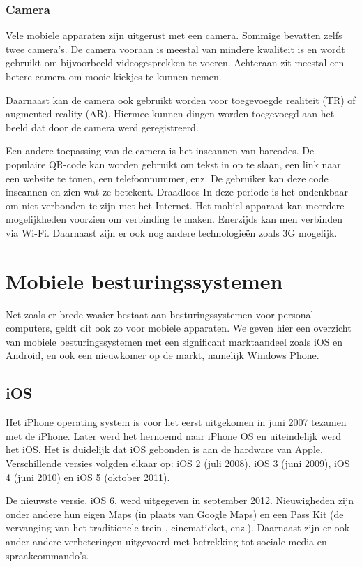\subsubsection{Camera}
Vele mobiele apparaten zijn uitgerust met een camera. Sommige bevatten zelfs twee camera's. De camera vooraan is meestal van mindere kwaliteit is en wordt gebruikt om bijvoorbeeld videogesprekken te voeren. Achteraan zit meestal een betere camera om mooie kiekjes te kunnen nemen.

Daarnaast kan de camera ook gebruikt worden voor toegevoegde realiteit (TR) of  augmented reality (AR). Hiermee kunnen dingen worden toegevoegd aan het beeld dat door de camera werd geregistreerd.

Een andere toepassing van de camera is het inscannen van barcodes. De populaire QR-code kan worden gebruikt om tekst in op te slaan, een link naar een website te tonen, een telefoonnummer, enz. De gebruiker kan deze code inscannen en zien wat ze betekent.
Draadloos
In deze periode is het ondenkbaar om niet verbonden te zijn met het Internet. Het mobiel apparaat kan meerdere mogelijkheden voorzien om verbinding te maken. Enerzijds kan men verbinden via Wi-Fi. Daarnaast zijn er ook nog andere technologieën zoals 3G mogelijk.


\section{Mobiele besturingssystemen}
Net zoals er brede waaier bestaat aan besturingssystemen voor personal computers, geldt dit ook zo voor mobiele apparaten. We geven hier een overzicht van mobiele besturingssystemen met een significant marktaandeel zoals iOS en Android, en ook een nieuwkomer op de markt, namelijk Windows Phone.

\subsection{iOS}
Het iPhone operating system is voor het eerst uitgekomen in juni 2007 tezamen met de iPhone. Later werd het hernoemd naar iPhone OS en uiteindelijk werd het iOS. Het is duidelijk dat iOS gebonden is aan de hardware van Apple. Verschillende versies volgden elkaar op: iOS 2 (juli 2008), iOS 3 (juni 2009), iOS 4 (juni 2010) en iOS 5 (oktober 2011). 

De nieuwste versie, iOS 6, werd uitgegeven in september 2012. Nieuwigheden zijn onder andere hun eigen Maps (in plaats van Google Maps) en een Pass Kit (de vervanging van het traditionele trein-, cinematicket, enz.). Daarnaast zijn er ook ander andere verbeteringen uitgevoerd met betrekking tot sociale media en spraakcommando's.


